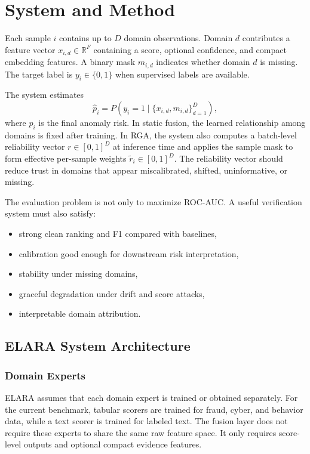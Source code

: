 \documentclass[10pt,conference]{IEEEtran}
\newcommand{\system}{ELARA}
\newcommand{\method}{RGA}
\begin{document}
\section{System and Method}
Each sample $i$ contains up to $D$ domain observations. Domain $d$ contributes a
feature vector $x_{i,d} \in \mathbb{R}^{F}$ containing a score, optional
confidence, and compact embedding features. A binary mask $m_{i,d}$ indicates
whether domain $d$ is missing. The target label is $y_i \in \{0,1\}$ when
supervised labels are available.

The system estimates
\begin{equation}
  \hat{p}_i = P(y_i=1 \mid \{x_{i,d},m_{i,d}\}_{d=1}^{D}),
\end{equation}
where $\hat{p}_i$ is the final anomaly risk. In static fusion, the learned
relationship among domains is fixed after training. In \method, the system also
computes a batch-level reliability vector $r \in [0,1]^D$ at inference time and
applies the sample mask to form effective per-sample weights
$\tilde r_i \in [0,1]^D$. The reliability vector should reduce trust in domains
that appear miscalibrated, shifted, uninformative, or missing.

The evaluation problem is not only to maximize ROC-AUC. A useful verification
system must also satisfy:
\begin{itemize}
  \item strong clean ranking and F1 compared with baselines,
  \item calibration good enough for downstream risk interpretation,
  \item stability under missing domains,
  \item graceful degradation under drift and score attacks,
  \item interpretable domain attribution.
\end{itemize}

\subsection{\system{} System Architecture}
\subsubsection{Domain Experts}
\system{} assumes that each domain expert is trained or obtained separately.
For the current benchmark, tabular scorers are trained for fraud, cyber, and
behavior data, while a text scorer is trained for labeled text. The fusion layer
does not require these experts to share the same raw feature space. It only
requires score-level outputs and optional compact evidence features.
\end{document}
